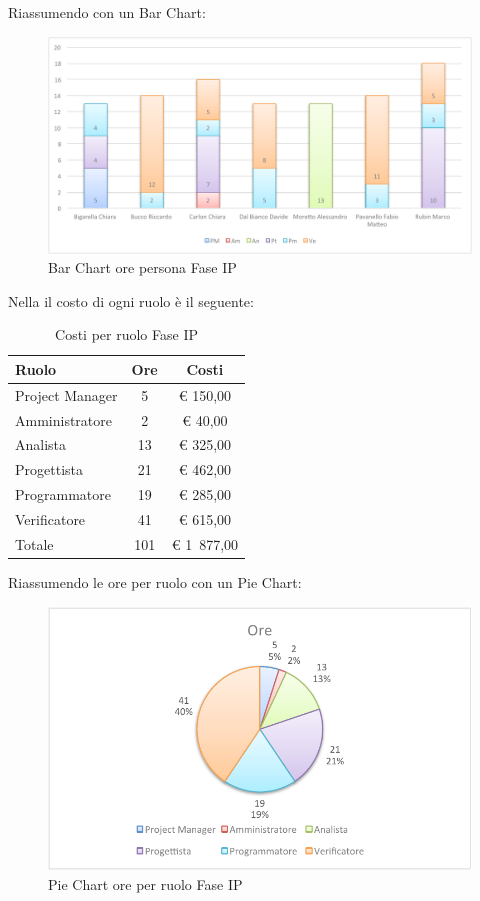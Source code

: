 				Riassumendo con un Bar Chart:
				\begin{figure}[H]\centering
					\includegraphics[width=\textwidth]{PianoDiProgetto/Pics/ChartOreFaseIP.pdf}
					\caption{Bar Chart ore persona Fase IP}
				\end{figure}
				Nella  il costo di ogni ruolo è il seguente:
				\begin{table}[H]
					\begin{center}
						\begin{tabular}{| l | c | c |}
							\hline
							Ruolo 				& Ore 		& Costi  \\ \hline
							
							Project Manager		& 5 		& \euro{} 150,00 	\\
							Amministratore 		& 2 		& \euro{} 40,00 	\\
							Analista	 		& 13 		& \euro{} 325,00 	\\
							Progettista 		& 21 		& \euro{} 462,00  	\\
							Programmatore		& 19		& \euro{} 285,00 	\\
							Verificatore		& 41 		& \euro{} 615,00 	\\ \hline \hline
								
							Totale	 			& 101 		& \euro{} 1~877,00 	\\ \hline
						\end{tabular}
					\end{center}
					\caption{Costi per ruolo Fase IP}
				\end{table}
				Riassumendo le ore per ruolo con un Pie Chart:
				\begin{figure}[H]\centering
					\includegraphics[width=\textwidth]{PianoDiProgetto/Pics/ChartTotOreFaseIP.pdf}
					\caption{Pie Chart ore per ruolo Fase IP}
				\end{figure}
